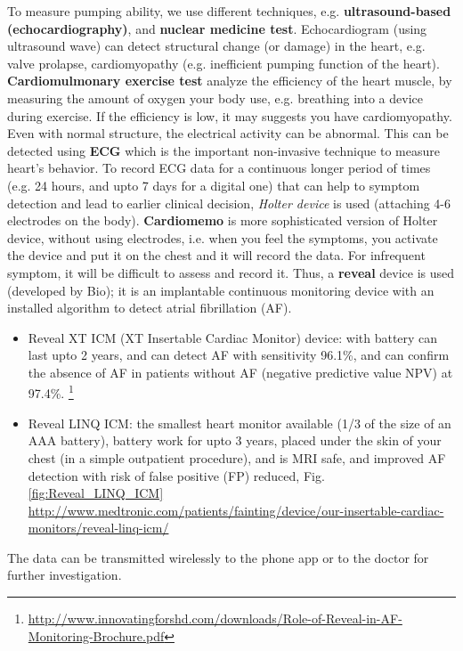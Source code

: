 To measure pumping ability, we use different techniques, e.g.
{\bf ultrasound-based (echocardiography)}, and {\bf nuclear medicine test}.
Echocardiogram (using ultrasound wave) can detect structural change (or damage)
in the heart, e.g. valve prolapse, cardiomyopathy (e.g. inefficient pumping
function of the heart). {\bf Cardiomulmonary exercise test} analyze the
efficiency of the heart muscle, by measuring the amount of oxygen your body use,
e.g. breathing into a device during exercise. If the efficiency is low, it may
suggests you have cardiomyopathy. Even with normal structure, the electrical
activity can be abnormal. This can be detected using {\bf ECG} which is the
important non-invasive technique to measure heart's behavior. To record ECG data
for a continuous longer period of times (e.g. 24 hours, and upto 7 days for a
digital one) that can help to symptom detection and lead to earlier clinical
decision, {\it Holter device} is used (attaching 4-6 electrodes on the body).
{\bf Cardiomemo} is more sophisticated version of Holter device, without using
electrodes, i.e. when you feel the symptoms, you activate the device and put it
on the chest and it will record the data. For infrequent symptom, it will be
difficult to assess and record it. Thus, a {\bf reveal} device is used
(developed by Bio); it is an implantable continuous monitoring device with an
installed algorithm to detect atrial fibrillation (AF).
\begin{itemize}
  \item  Reveal XT ICM (XT Insertable Cardiac Monitor) device: with battery can
  last upto 2 years, and can detect AF with sensitivity 96.1\%, and can confirm
  the absence of AF in patients without AF (negative predictive value NPV) at 97.4\%.
\footnote{\url{http://www.innovatingforshd.com/downloads/Role-of-Reveal-in-AF-Monitoring-Brochure.pdf}}

  \item Reveal LINQ ICM: the smallest heart
  monitor available (1/3 of the size of an AAA battery), battery work for upto 3
  years, placed under the skin of your chest (in a simple outpatient procedure), and is MRI safe, and improved AF detection with risk of false positive (FP)
  reduced, Fig.\ref{fig:Reveal_LINQ_ICM}
  \url{http://www.medtronic.com/patients/fainting/device/our-insertable-cardiac-monitors/reveal-linq-icm/}
\end{itemize}
The data can be transmitted wirelessly to the phone app or to the doctor for
further investigation.


